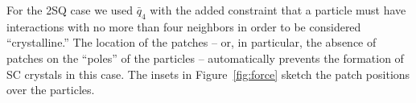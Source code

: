 For the 2SQ case we used $\bar{q}_4$ with the added constraint that a particle must have interactions with no more than four neighbors in order to be considered ``crystalline.'' The location of the patches -- or, in particular, the absence of patches on the ``poles'' of the particles -- automatically prevents the formation of SC crystals in this case. The insets in Figure~\ref{fig:force} sketch the patch positions over the particles.

\begin{figure}
	\begin{center}


\end{center}
\end{figure}
